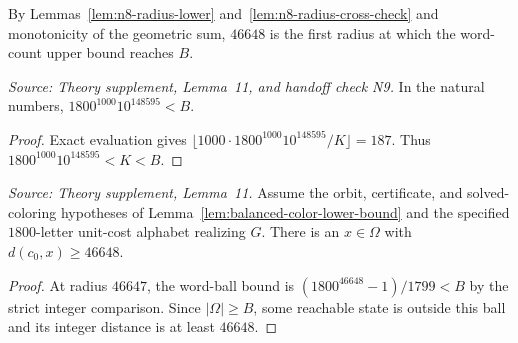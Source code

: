 By Lemmas~\ref{lem:n8-radius-lower} and~\ref{lem:n8-radius-cross-check}
and monotonicity of the geometric sum, \(46648\) is the first radius
at which the word-count upper bound reaches \(B\).

\begin{lemma}
  \label{lem:n9-support-comparison}
  \leanok
  \textit{Source: Theory supplement, Lemma~11, and handoff check N9.}
  In the natural numbers, \(1800^{1000}10^{148595}<B\).
\end{lemma}
\begin{proof}
  \leanok
  Exact evaluation gives
  \(\lfloor1000\cdot1800^{1000}10^{148595}/K\rfloor=187\).
  Thus \(1800^{1000}10^{148595}<K<B\).
\end{proof}

\begin{lemma}
  \label{lem:word-distance-lower-bound}
  \leanok
  \textit{Source: Theory supplement, Lemma~11.}
  Assume the orbit, certificate, and solved-coloring hypotheses of
  Lemma~\ref{lem:balanced-color-lower-bound} and the specified
  \(1800\)-letter unit-cost alphabet realizing \(G\). There is an
  \(x\in\Omega\) with \(d(c_0,x)\ge46648\).
\end{lemma}
\begin{proof}
  \leanok
  At radius \(46647\), the word-ball bound is
  \((1800^{46648}-1)/1799<B\) by the strict integer comparison.
  Since \(|\Omega|\ge B\), some reachable state is outside this ball
  and its integer distance is at least \(46648\).
\end{proof}

